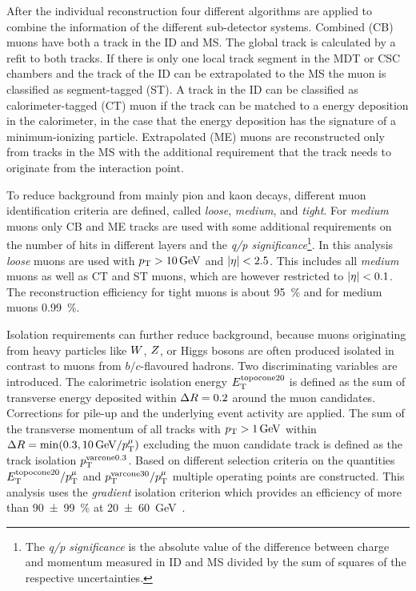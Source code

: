 After the individual reconstruction four different algorithms are applied to combine the information of the different
sub-detector systems.
Combined (CB) muons have both a track in the ID and MS\@. The global track is calculated by a refit to both tracks.
If there is only one local track segment in the MDT or CSC chambers and the track of the ID can be extrapolated to the MS
the muon is classified as segment-tagged (ST).
A track in the ID can be classified as calorimeter-tagged (CT) muon if the track can be matched to a energy deposition
in the calorimeter, in the case that the energy deposition has the signature of a minimum-ionizing particle.
Extrapolated (ME) muons are reconstructed only from tracks in the MS with the additional requirement that the track
needs to originate from the interaction point.

To reduce background from mainly pion and kaon decays, different muon identification criteria are defined, called
\emph{loose}, \emph{medium}, and \emph{tight}.
For \emph{medium} muons only CB and ME tracks are used with some additional requirements on the number of hits in
different layers and the \emph{q/p significance}\footnote{The \emph{q/p significance} is the absolute value of the
difference between charge and momentum measured in ID and MS divided by the sum of squares of the respective uncertainties.}.
In this analysis \emph{loose} muons are used with $\pt > \SI{10}{\GeV}$ and $\left|\eta\right| < 2.5$.
This includes all \emph{medium} muons as well as CT and ST muons, which are however restricted to $\left|\eta\right| < 0.1$.
The reconstruction efficiency for tight muons is about \SI{95}{\percent} and for medium muons \SI{0.99}{\percent}.

Isolation requirements can further reduce background, because muons originating from heavy particles like $W$, $Z$,
or Higgs bosons are often produced isolated
in contrast to muons from $b/c$-flavoured hadrons.
Two discriminating variables are introduced.
The calorimetric isolation energy $E_\text{T}^{\text{topocone}20}$ is defined as the sum of transverse energy deposited within
$\Delta R = 0.2$ around the muon candidates.
Corrections for pile-up and the underlying event activity are applied.
The sum of the transverse momentum of all tracks with $\pt > \SI{1}{\GeV}$ within $\dr = \min(0.3, \SI{10}{\GeV} / \pt^\mu)$
excluding the muon candidate track
is defined as the track isolation $p_\text{T}^{\text{varcone}0.3}$.
Based on different selection criteria on the quantities $E_\text{T}^{\text{topocone}20} / p_\text{T}^\mu$ and
$p_\text{T}^{\text{varcone}30} / p_\text{T}^\mu$ multiple operating points are constructed.
This analysis uses the \emph{gradient} isolation criterion which provides an efficiency of more than
\SI{90(99)}{\percent} at \SI{20(60)}{\GeV}~\cite{PERF-2015-10}.

